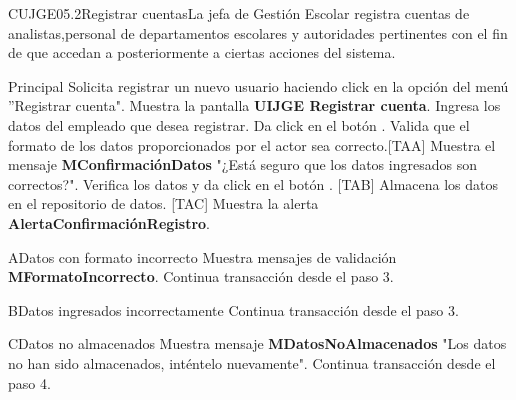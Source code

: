 \begin{UseCase}{CUJGE05.2}{Registrar cuentas}{La jefa de Gestión Escolar registra cuentas de analistas,personal de departamentos escolares y autoridades pertinentes con el fin de que accedan a posteriormente a ciertas acciones del sistema.}
\end{UseCase}

\begin{UCtrayectoria}{Principal}
  \UCpaso[\UCactor] Solicita registrar un nuevo usuario haciendo click en la opción del menú ''Registrar cuenta".
  \UCpaso Muestra la pantalla {\bf UIJGE Registrar cuenta}.
  \UCpaso[\UCactor] Ingresa los datos del empleado que desea registrar.
  \UCpaso[\UCactor] Da click en el botón .
  \UCpaso Valida que el formato de los datos proporcionados por el actor sea correcto.[TAA]
  \UCpaso Muestra el mensaje {\bf MConfirmaciónDatos} "¿Está seguro que los datos ingresados son correctos?".
  \UCpaso[\UCactor] Verifica los datos y da click en el botón . [TAB]
  \UCpaso Almacena los datos en el repositorio de datos. [TAC]
  \UCpaso Muestra la alerta  {\bf AlertaConfirmaciónRegistro}.
\end{UCtrayectoria}

\begin{UCtrayectoriaA}{A}{Datos con formato incorrecto} 
  \UCpaso Muestra mensajes de validación {\bf MFormatoIncorrecto}.
  \UCpaso Continua transacción desde el paso 3.
\end{UCtrayectoriaA}

\begin{UCtrayectoriaA}{B}{Datos ingresados incorrectamente} 
  \UCpaso Continua transacción desde el paso 3.
\end{UCtrayectoriaA}

\begin{UCtrayectoriaA}{C}{Datos no almacenados} 
  \UCpaso Muestra mensaje {\bf MDatosNoAlmacenados} "Los datos no han sido almacenados, inténtelo nuevamente".
  \UCpaso Continua transacción desde el paso 4.
\end{UCtrayectoriaA}



